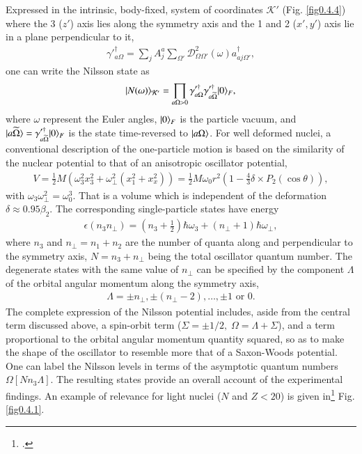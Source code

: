 Expressed in the intrinsic, body-fixed, system of coordinates $\mathcal K'$ (Fig. \ref{fig0.4.4}) where the 3 ($z'$) axis lies along the symmetry axis and the 1 and 2 ($x',y'$) axis lie in a plane perpendicular to it, 
\begin{align}\label{eq0.4.6}
\gamma'^{\dagger}_{a\Omega}=\sum_jA_j^a\sum_{\Omega'}\mathcal D_{\Omega\Omega'}^2(\omega)a^\dagger_{aj\Omega'},
\end{align}
one can write the Nilsson state as 
\begin{align}\label{eq0.4.7}
|{N(\omega)} \rangle_{\mathcal K'}=\prod_{a\Omega>0}\gamma'^{\dagger}_{a\Omega}\gamma'^{\dagger}_{a\widetilde\Omega}|{0} \rangle_F,
\end{align}
where $\omega$ represent the Euler angles, $|{0} \rangle_F$ is the particle vacuum, and $|{a\widetilde\Omega} \rangle=\gamma'^{\dagger}_{a\widetilde\Omega}|{0} \rangle_F$ is the state time-reversed to $|{a\Omega} \rangle$. For well deformed nuclei, a conventional description of the one-particle motion is based on the similarity of the nuclear potential to that of an anisotropic oscillator potential, 
\begin{align}\label{eq0.4.8}
V=\frac{1}{2}M\left(\omega_3^2x_3^2+\omega^2_{\perp}(x_1^2+x_x^2)\right)=\frac{1}{2}M\omega_0r^2\left(1-\frac{4}{3}\delta\times P_2(\cos\theta)\right),
\end{align}
with $\omega_3\omega_{\perp}^2=\omega_0^3$. That is a volume which is independent of the deformation $\delta\approx0.95\beta_2$. The corresponding single-particle states have energy
\begin{align}\label{eq0.4.9}
\epsilon(n_3n_{\perp})=(n_3+\tfrac{1}{2})\hbar\omega_3+(n_{\perp}+1)\hbar\omega_{\perp},
\end{align}
where $n_3$ and $n_{\perp}=n_1+n_2$ are the number of quanta along and perpendicular to the symmetry axis, $N=n_3+n_{\perp}$ being the total oscillator quantum number. The degenerate states with the same value of $n_{\perp}$ can be specified by the component $\Lambda$ of the orbital angular momentum along the symmetry axis,
\begin{align}\label{eq0.4.10}
\Lambda=\pm n_{\perp}, \pm(n_{\perp}-2),\dots,\pm 1\text{ or } 0.
\end{align}
The complete expression of the Nilsson potential includes, aside from the central term discussed above, a spin-orbit term ($\Sigma=\pm1/2,\;\Omega=\Lambda+\Sigma$), and a term proportional to the orbital angular momentum quantity squared, so as to make the shape of the oscillator to resemble more that of a Saxon-Woods potential. One can  label the Nilsson levels in terms of the asymptotic quantum numbers $\Omega[Nn_3\Lambda]$. The resulting states provide an overall account of the experimental findings. An example of relevance for light nuclei ($N$ and $Z<20$) is given in\footnote{\cite{Mottelson:59}.} Fig. \ref{fig0.4.1}.

